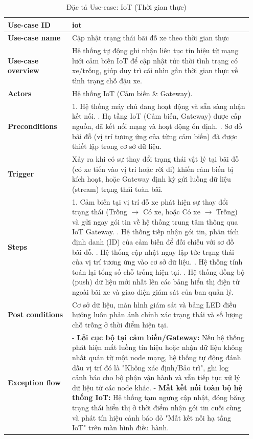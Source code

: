 \begin{table}[htpb]
\centering
\renewcommand{\arraystretch}{1.4}
\begin{tabular}{|p{0.25\linewidth}|p{0.7\linewidth}|}
\hline
\textbf{Use-case ID} & iot \\ \hline
\textbf{Use-case name} & Cập nhật trạng thái bãi đỗ xe theo thời gian thực \\ \hline
\textbf{Use-case overview} & Hệ thống tự động ghi nhận liên tục tín hiệu từ mạng lưới cảm biến IoT để cập nhật tức thời tình trạng có xe/trống, giúp duy trì cái nhìn gần thời gian thực về tình trạng chỗ đậu xe. \\ \hline
\textbf{Actors} & Hệ thống IoT (Cảm biến \& Gateway). \\ \hline
\textbf{Preconditions} & 
1. Hệ thống máy chủ đang hoạt động và sẵn sàng nhận kết nối. \newline
2. Hạ tầng IoT (Cảm biến, Gateway) được cấp nguồn, đã kết nối mạng và hoạt động ổn định. \newline
3. Sơ đồ bãi đỗ (vị trí tương ứng của từng cảm biến) đã được thiết lập trong cơ sở dữ liệu. \\ \hline
\textbf{Trigger} & Xảy ra khi có sự thay đổi trạng thái vật lý tại bãi đỗ (có xe tiến vào vị trí hoặc rời đi) khiến cảm biến bị kích hoạt, hoặc Gateway định kỳ gửi luồng dữ liệu (stream) trạng thái toàn bãi. \\ \hline
\textbf{Steps} & 
1. Cảm biến tại vị trí đỗ xe phát hiện sự thay đổi trạng thái (Trống $\rightarrow$ Có xe, hoặc Có xe $\rightarrow$ Trống) và gửi ngay gói tin về hệ thống trung tâm thông qua IoT Gateway. \newline
2. Hệ thống tiếp nhận gói tin, phân tích định danh (ID) của cảm biến để đối chiếu với sơ đồ bãi đỗ. \newline
3. Hệ thống cập nhật ngay lập tức trạng thái của vị trí tương ứng vào cơ sở dữ liệu. \newline
4. Hệ thống tính toán lại tổng số chỗ trống hiện tại. \newline
5. Hệ thống đồng bộ (push) dữ liệu mới nhất lên các bảng hiển thị điện tử ngoài bãi xe và giao diện giám sát của ban quản lý. \\ \hline
\textbf{Post conditions} & Cơ sở dữ liệu, màn hình giám sát và bảng LED điều hướng luôn phản ánh chính xác trạng thái và số lượng chỗ trống ở thời điểm hiện tại.\\ \hline
\textbf{Exception flow} & - \textbf{Lỗi cục bộ tại cảm biến/Gateway:} Nếu hệ thống phát hiện mất luồng tín hiệu hoặc nhận dữ liệu không nhất quán từ một node mạng, hệ thống tự động đánh dấu vị trí đó là "Không xác định/Bảo trì", ghi log cảnh báo cho bộ phận vận hành và vẫn tiếp tục xử lý dữ liệu từ các node khác.\newline
- \textbf{Mất kết nối toàn bộ hệ thống IoT:} Hệ thống tạm ngưng cập nhật, đóng băng trạng thái hiển thị ở thời điểm nhận gói tin cuối cùng và phát tín hiệu cảnh báo đỏ "Mất kết nối hạ tầng IoT" trên màn hình điều hành. \\ \hline
\end{tabular}
\caption{Đặc tả Use-case: IoT (Thời gian thực)}
\label{tab:uc_iot}
\end{table}


